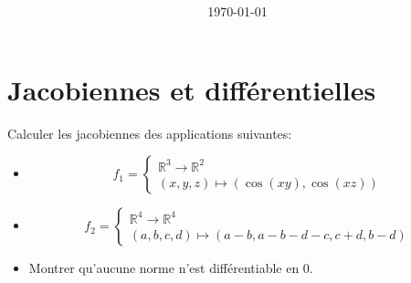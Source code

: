 \documentclass[
10pt, %
a4paper, %
oneside, %
headinclude,footinclude, %
BCOR5mm, %
]{scrartcl}
\title{\normalfont{FTML Exercices 6}\\
}
\author{\spacedlowsmallcaps{}
}
\date{\today}
\begin{document}
\renewcommand{\sectionmark}[1]{\markright{\spacedlowsmallcaps{#1}}}
\lehead{\mbox{\llap{\small\thepage\kern1em\color{halfgray} \vline}\color{halfgray}\hspace{0.5em}\rightmark\hfil}} 
\pagestyle{scrheadings}
\maketitle 
\setcounter{tocdepth}{3} 

\tableofcontents

\section{\large\color{Blue}Jacobiennes et différentielles}

Calculer les jacobiennes des applications suivantes:

\begin{itemize}
    \item[1]

$$
f_1 = \left\{
    \begin{array}{ll}
        \mathbb{R}^3 \rightarrow \mathbb{R}^2  \\
	(x, y, z)\mapsto (\cos(xy), \cos(xz))
   \end{array}
\right.
$$

    \item[2]

$$
f_2 = \left\{
    \begin{array}{ll}
        \mathbb{R}^4 \rightarrow \mathbb{R}^4  \\
	(a, b, c, d)\mapsto (a-b, a-b-d-c, c+d, b-d)
   \end{array}
\right.
$$

    \item[3]
	
	Montrer qu'aucune norme n'est différentiable en 0.

\end{itemize}
\end{document}
